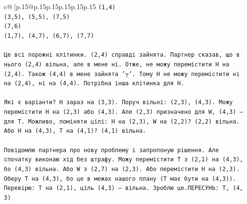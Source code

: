 \documentclass{article}
\begin{document}
{\begin{supertabular}{c@{$\;$}|p{.15\linewidth}@{}p{.15\linewidth}p{.15\linewidth}p{.15\linewidth}p{.15\linewidth}p{.15\linewidth}}
{{{\texttt{(1,4)} \\
\texttt{(3,5), (5,5), (7,5)} \\
\texttt{(7,6)} \\
\texttt{(1,7), (4,7), (6,7), (7,7)} \\
\\ 
\texttt{Це всі порожні клітинки. (2,4) справді зайнята. Партнер сказав, що в нього (2,4) вільна, але в мене ні. Отже, не можу перемістити H на (2,4). Також (4,4) в мене зайнята '┬'. Тому H не можу перемістити ні на (2,4), ні на (4,4). Потрібна інша клітинка для H.} \\
\\ 
\texttt{Які є варіанти? H зараз на (3,3). Поруч вільні: (2,3), (4,3). Можу перемістити H на (2,3) або (4,3). Але (2,3) призначено для W, (4,3) — для T. Можливо, поміняти цілі: H на (2,3), W на (2,2)? (2,2) вільна. Або H на (4,3), T на (4,1)? (4,1) вільна.} \\
\\ 
\texttt{Повідомлю партнера про нову проблему і запропоную рішення. Але спочатку виконаю хід без штрафу. Можу перемістити T з (2,1) на (4,3), бо (4,3) вільна. Або W з (2,7) на (2,3). Або перемістити H на (2,3). Оберу T на (4,3), бо це в межах нашого плану (T має бути на (4,3)). Перевірю: T на (2,1), ціль (4,3) — вільна. Зроблю це.ПЕРЕСУНЬ: T, (4, 3)} \\
            }
        }
    }
     \\ \\


\end{supertabular}}
\end{document}
